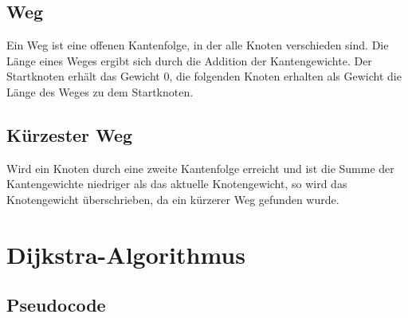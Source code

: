 \documentclass[12pt]{article}
\begin{document}
	\subsection{Weg}
		Ein Weg ist eine offenen Kantenfolge, in der alle Knoten verschieden sind.
		\cite{kanten}
		Die Länge eines Weges ergibt sich durch die Addition der Kantengewichte. Der Startknoten erhält das Gewicht 0, die folgenden Knoten erhalten als Gewicht die Länge des Weges zu dem Startknoten.
		
	\subsection{Kürzester Weg}
		 Wird ein Knoten durch eine zweite Kantenfolge erreicht und ist die Summe der Kantengewichte niedriger als das aktuelle Knotengewicht, so wird das Knotengewicht überschrieben, da ein kürzerer Weg gefunden wurde.
		
	

\newpage	
\section{Dijkstra-Algorithmus}
	\subsection{Pseudocode}
		
		\cite{dijkstrapseudo}
	
\end{document}
